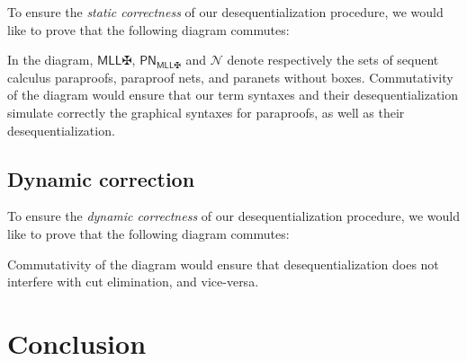 \documentclass[12pt]{report}
\newcommand{\dai}{✠}
\newcommand{\cutred}{\rightsquigarrow}
\begin{document}
To ensure the \emph{static correctness} of our desequentialization procedure, we would like to prove
that the following diagram commutes:

\begin{mathpar}
\end{mathpar}

In the diagram, $\mathsf{MLL}\dai$, $\mathsf{PN}_{\mathsf{MLL}\dai}$ and $\mathcal{N}$ denote
respectively the sets of sequent calculus paraproofs, paraproof nets, and paranets without boxes.
Commutativity of the diagram would ensure that our term syntaxes and their desequentialization
simulate correctly the graphical syntaxes for paraproofs, as well as their desequentialization.

\section{Dynamic correction}

To ensure the \emph{dynamic correctness} of our desequentialization procedure, we would like to
prove that the following diagram commutes:

\begin{mathpar}
\end{mathpar}

Commutativity of the diagram would ensure that desequentialization does not interfere with cut
elimination, and vice-versa.

\chapter*{Conclusion}
\end{document}
